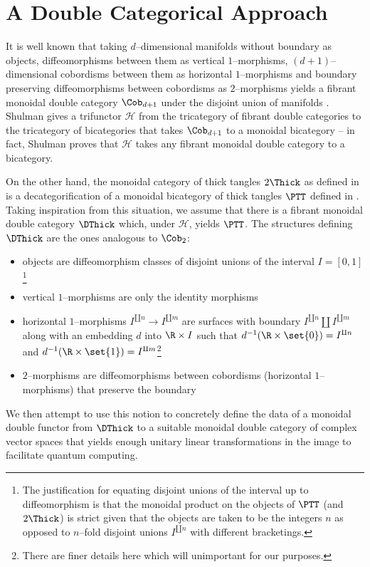 \documentclass[\PRJWD/Thick_TQFTs_and_Quantum_Information.tex]{subfiles}
\begin{document}
\section{A Double Categorical Approach}

It is well known that taking $d$--dimensional manifolds without boundary as
objects, diffeomorphisms between them as vertical $1$--morphisms, $(d +
1)$--dimensional cobordisms between them as horizontal $1$--morphisms and
boundary preserving diffeomorphisms between cobordisms as $2$--morphisms yields
a fibrant monoidal double category $\Cob_{d + 1}$ under the disjoint union of
manifolds \cite{SymMonBicat}. Shulman gives a trifunctor $\mathcal{H}$ from the
tricategory of fibrant double categories to the tricategory of bicategories that
takes $\Cob_{d + 1}$ to a monoidal bicategory -- in fact, Shulman proves that
$\mathcal{H}$ takes any fibrant monoidal double category to a bicategory.

On the other hand, the monoidal category of thick tangles $2\Thick$ as defined
in \cite{NonCommTQFT} is a decategorification of a monoidal bicategory of thick
tangles $\PTT$ defined in \cite{NonSemiSimp}. Taking inspiration from this
situation, we assume that there is a fibrant monoidal double category
$\DThick$ which, under $\mathcal{H}$, yields $\PTT$. The structures defining
$\DThick$ are the ones analogous to $\Cob_{2}$:
\begin{itemize}
\setlength{\itemsep}{0pt}
\item objects are diffeomorphism classes of disjoint unions of the interval
$I = [0, 1]$\footnote{The justification for equating disjoint unions of the
interval up to diffeomorphism is that the monoidal product on the objects of
$\PTT$ (and $2\Thick$) is strict given that the objects are taken to be the
integers $n$ as opposed to $n$--fold disjoint unions $I^{\amalg n}$ with
different bracketings.}
\item vertical $1$--morphisms are only the identity morphisms
\item horizontal $1$--morphisms $I^{\amalg n} \to I^{\amalg m}$ are surfaces
with boundary $I^{\amalg n} \amalg I^{\amalg m}$ along with an embedding $d$
into $\R \times I$ such that $d^{-1}(\R \times \set{0}) = I^{\amalg n}$ and
$d^{-1}(\R \times \set{1}) = I^{\amalg m}$\footnote{There are finer details here
which will unimportant for our purposes.}
\item $2$--morphisms are diffeomorphisms between cobordisms
(horizontal $1$--morphisms) that preserve the boundary
\end{itemize}
We then attempt to use this notion to concretely define the data of a monoidal
double functor from $\DThick$ to a suitable monoidal double category of complex
vector spaces that yields enough unitary linear transformations in the image to
facilitate quantum computing.
\end{document}
